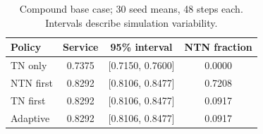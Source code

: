 \begin{table}[t]
\centering
\caption{Compound base case; 30 seed means, 48 steps each. Intervals describe simulation variability.}
\label{tab:base}
\par\smallskip
\footnotesize
\begin{tabular}{lccc}\toprule
Policy & Service & 95\% interval & NTN fraction \\ \midrule
TN only & 0.7375 & [0.7150, 0.7600] & 0.0000 \\
NTN first & 0.8292 & [0.8106, 0.8477] & 0.7208 \\
TN first & 0.8292 & [0.8106, 0.8477] & 0.0917 \\
Adaptive & 0.8292 & [0.8106, 0.8477] & 0.0917 \\
\bottomrule\end{tabular}
\end{table}
